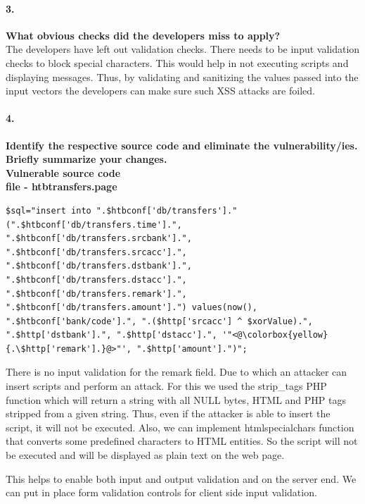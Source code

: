 \documentclass[12pt]{report}
\begin{document}
	\paragraph*{3.}{\bf What obvious checks did the developers miss to apply?}\\
	
	The developers have left out validation checks. There needs to be input validation checks to block special characters. This would help in not executing scripts and displaying messages. Thus, by validating and sanitizing the values passed into the input vectors the developers can make sure such XSS attacks are foiled. 
	
	\paragraph*{4.}{\bf Identify the respective source code and eliminate the vulnerability/ies. Briefly summarize your changes.}\\
	{\bf Vulnerable source code}\\
	{\bf file - htbtransfers.page}\\
	\begin{lstlisting}[breaklines=true]
$sql="insert into ".$htbconf['db/transfers']." (".$htbconf['db/transfers.time'].", ".$htbconf['db/transfers.srcbank'].", ".$htbconf['db/transfers.srcacc'].", ".$htbconf['db/transfers.dstbank'].", ".$htbconf['db/transfers.dstacc'].", ".$htbconf['db/transfers.remark'].", ".$htbconf['db/transfers.amount'].") values(now(), ".$htbconf['bank/code'].", ".($http['srcacc'] ^ $xorValue).", ".$http['dstbank'].", ".$http['dstacc'].", '"<@\colorbox{yellow}{.\$http['remark'].}@>"', ".$http['amount'].")";
	\end{lstlisting}
	

	There is no input validation for the remark field. Due to which an attacker can insert scripts and perform an attack. For this we used the strip\_tags PHP function which will return a string with all NULL bytes, HTML and PHP tags stripped from a given string. Thus, even if the attacker is able to insert the script, it will not be executed. Also, we can implement htmlspecialchars function that converts some predefined characters to HTML entities. So the script will not be executed and will be displayed as plain text on the web page.
	
	This helps to enable both input and output validation and on the server end. We can put in place form validation controls for client side input validation.
	
\end{document}
